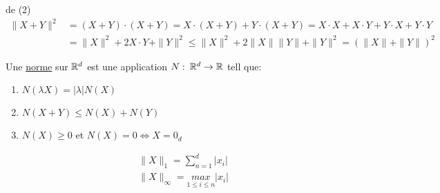 \documentclass[a4paper]{report}
\begin{document}
\begin{explanation}
    de (2)
    \begin{align*}
        \|X + Y\|^2 &= (X + Y)\cdot(X + Y) = X \cdot (X + Y) + Y \cdot (X + Y) = X \cdot X + X \cdot Y + Y \cdot X + Y \cdot Y\\
                    &= \|X\|^2 + 2X \cdot Y + \|Y\|^2 \le \|X\|^2 + 2\|X\| \|Y\| + \|Y\|^2 = (\|X\| + \|Y\|)^2
    \end{align*}
\end{explanation}
\begin{definition}
    Une \underline{norme} sur $\mathbb{R}^d$ est une application  $N: \: \mathbb{R}^d \to \mathbb{R}$ tell que:
    \begin{enumerate}
        \item $N(\lambda X) = |\lambda|N(X)$
        \item  $N(X + Y) \le N(X) + N(Y)$
        \item $N(X) \ge 0$ et $N(X) = 0 \iff X = 0_d$
    \end{enumerate}
\end{definition}
\begin{eg}
   \begin{align*}
       &\|X\|_1 = \sum_{n=1}^{d} |x_i|\\
       &\|X\|_{\infty} = \underset{1\le i \le n}{max} |x_i|
   \end{align*} 
\end{eg}
\end{document}
